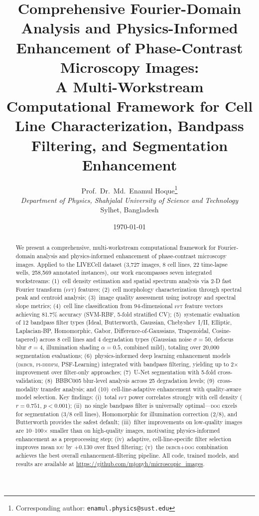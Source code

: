 \documentclass[11pt,a4paper]{article}
\title{\textbf{Comprehensive Fourier-Domain Analysis and Physics-Informed
Enhancement of Phase-Contrast Microscopy Images:\\
A Multi-Workstream Computational Framework for Cell Line
Characterization, Bandpass Filtering, and Segmentation Enhancement}}
\author{
Prof.~Dr.~Md.~Enamul Hoque\thanks{Corresponding author: \texttt{enamul.physics@sust.edu}} \\
\textit{Department of Physics, Shahjalal University of Science and Technology} \\
Sylhet, Bangladesh
}
\date{\today}
\newcommand{\fft}{\textsc{fft}\xspace}
\newcommand{\iou}{\textsc{iou}\xspace}
\newcommand{\debcr}{\textsc{debcr}\xspace}
\newcommand{\piddpm}{\textsc{pi-dddpm}\xspace}
\newcommand{\dog}{\textsc{dog}\xspace}
\begin{document}
\maketitle

\begin{abstract}
We present a comprehensive, multi-workstream computational framework for
Fourier-domain analysis and physics-informed enhancement of phase-contrast
microscopy images. Applied to the LIVECell dataset (3,727 images, 8 cell
lines, 22 time-lapse wells, 258,569 annotated instances), our work
encompasses seven integrated workstreams: (1)~cell density estimation and
spatial spectrum analysis via 2-D fast Fourier transform (\fft) features;
(2)~cell morphology characterization through spectral peak and centroid
analysis; (3)~image quality assessment using isotropy and spectral slope
metrics; (4)~cell line classification from 94-dimensional \fft feature
vectors achieving 81.7\% accuracy (SVM-RBF, 5-fold stratified CV);
(5)~systematic evaluation of 12 bandpass filter types (Ideal, Butterworth,
Gaussian, Chebyshev~I/II, Elliptic, Laplacian-BP, Homomorphic, Gabor,
Difference-of-Gaussians, Trapezoidal, Cosine-tapered) across 8 cell lines
and 4 degradation types (Gaussian noise $\sigma{=}50$, defocus blur
$\sigma{=}4$, illumination shading $\alpha{=}0.5$, combined mild), totaling
over 20,000 segmentation evaluations; (6)~physics-informed deep learning
enhancement models (\debcr, \piddpm, PSF-Learning) integrated with
bandpass filtering, yielding up to 2$\times$ improvement over
filter-only approaches; (7)~U-Net segmentation with 5-fold
cross-validation; (8)~BBBC005 blur-level analysis across 25 degradation
levels; (9)~cross-modality transfer analysis; and (10)~cell-line-adaptive
enhancement with quality-aware model selection. Key findings: (i)~total
\fft power correlates strongly with cell density ($r{=}0.751$, $p{<}0.001$);
(ii)~no single bandpass filter is universally optimal---\dog excels for
segmentation (3/8 cell lines), Homomorphic for illumination correction
(2/8), and Butterworth provides the safest default; (iii)~filter
improvements on low-quality images are 10--100$\times$ smaller than on
high-quality images, motivating physics-informed enhancement as a
preprocessing step; (iv)~adaptive, cell-line-specific filter selection
improves mean \iou by $+$0.130 over fixed filtering; (v)~the
\debcr$+$\dog combination achieves the best overall enhancement-filtering
pipeline. All code, trained models, and results are available at
\url{https://github.com/mjonyh/microscopic_images}.
\end{abstract}
\end{document}
